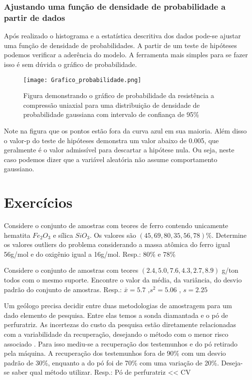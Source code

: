 \subsubsection{Ajustando uma função de densidade de probabilidade a partir de dados}

Após realizado o histograma e a estatística descritiva dos dados pode-se ajustar uma função de densidade de probabilidades. A partir de um teste de hipóteses podemos verificar a aderência do modelo. A ferramenta mais simples para se fazer isso é sem dúvida o gráfico de probabilidade. 

\begin{figure}[H]
  	\centering
  	\texttt{[image: Grafico\_probabilidade.png]}	
  	\caption{Figura demonstrando o gráfico de probabilidade da resistência a compressão uniaxial para uma distribuição de densidade de probabilidade gaussiana com intervalo de confiança de 95\% }
  	\label{Grafico_probabilidade}
\end{figure}

Note na figura que os pontos estão fora da curva azul em sua maioria. Além disso o valor-p do teste de hipóteses demonstra um valor abaixo de 0.005, que geralmente é o valor admissível para descartar a hipótese nula. Ou seja, neste caso podemos dizer que a variável aleatória não assume comportamento gaussiano.  

\section{Exercícios}

\begin{exercise}
	Considere o conjunto de amostras com teores de ferro contendo unicamente hematita $Fe_{2}O_{3}$ e sílica $SiO_{3}$. Os valores são $\left(45,69,80,35,56,78\right)\%$. Determine os valores outliers do problema considerando a massa atômica do ferro igual 56g/mol e do oxigênio igual a 16g/mol. Resp.: 80\% e 78\%
\end{exercise}
\begin{exercise}
	Considere o conjunto de amostras com teores $\left(2.4,5.0,7.6,4.3,2.7,8.9\right)$ g/ton todos com o mesmo suporte. Encontre o valor da média, da variância, do desvio padrão do conjunto de amostras. Resp.: $\bar{x}= 5.7$ ,$s^2 = 5.06$ , $s = 2.25$
\end{exercise}
\begin{exercise}
	Um geólogo precisa decidir entre duas metodologias de amostragem para um dado elemento de pesquisa. Entre elas temos a sonda diamantada e o pó de perfuratriz. As incertezas do custo da pesquisa estão diretamente relacionadas com a variabilidade da recuperação, desejando o método com o menor risco associado . Para isso mediu-se a recuperação dos testemunhos e do pó retirado pela máquina. A recuperação dos testemunhos fora de 90\% com um desvio padrão de 30\%, enquanto a do pó foi de 70\% com uma variação de 20\%. Deseja-se saber qual método utilizar. Resp.: Pó de perfuratriz << CV
\end{exercise}
	
	 

